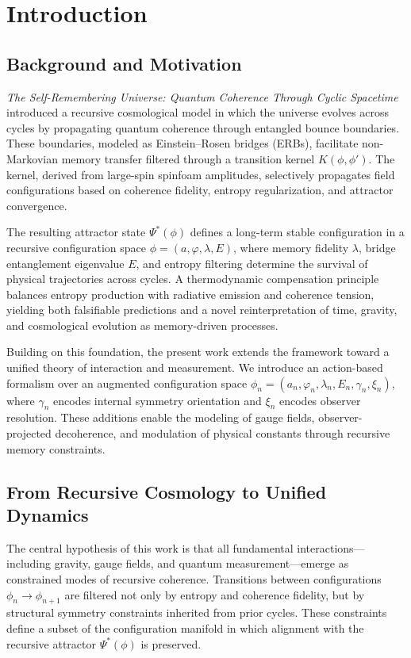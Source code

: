\section{Introduction}
\label{sec:introduction}

\subsection{Background and Motivation}

\textit{The Self-Remembering Universe: Quantum Coherence Through Cyclic Spacetime}~\cite{parian2025selfrememberingI} introduced a recursive cosmological model in which the universe evolves across cycles by propagating quantum coherence through entangled bounce boundaries. These boundaries, modeled as Einstein–Rosen bridges (ERBs), facilitate non-Markovian memory transfer filtered through a transition kernel \( K(\phi, \phi') \). The kernel, derived from large-spin spinfoam amplitudes, selectively propagates field configurations based on coherence fidelity, entropy regularization, and attractor convergence.

The resulting attractor state \( \Psi^*(\phi) \) defines a long-term stable configuration in a recursive configuration space \( \phi = (a, \varphi, \lambda, E) \), where memory fidelity \( \lambda \), bridge entanglement eigenvalue \( E \), and entropy filtering determine the survival of physical trajectories across cycles. A thermodynamic compensation principle balances entropy production with radiative emission and coherence tension, yielding both falsifiable predictions and a novel reinterpretation of time, gravity, and cosmological evolution as memory-driven processes.

Building on this foundation, the present work extends the framework toward a unified theory of interaction and measurement. We introduce an action-based formalism over an augmented configuration space \( \phi_n = (a_n, \varphi_n, \lambda_n, E_n, \gamma_n, \xi_n) \), where \( \gamma_n \) encodes internal symmetry orientation and \( \xi_n \) encodes observer resolution. These additions enable the modeling of gauge fields, observer-projected decoherence, and modulation of physical constants through recursive memory constraints.

\subsection{From Recursive Cosmology to Unified Dynamics}

The central hypothesis of this work is that all fundamental interactions—including gravity, gauge fields, and quantum measurement—emerge as constrained modes of recursive coherence. Transitions between configurations \( \phi_n \to \phi_{n+1} \) are filtered not only by entropy and coherence fidelity, but by structural symmetry constraints inherited from prior cycles. These constraints define a subset of the configuration manifold in which alignment with the recursive attractor \( \Psi^*(\phi) \) is preserved.

